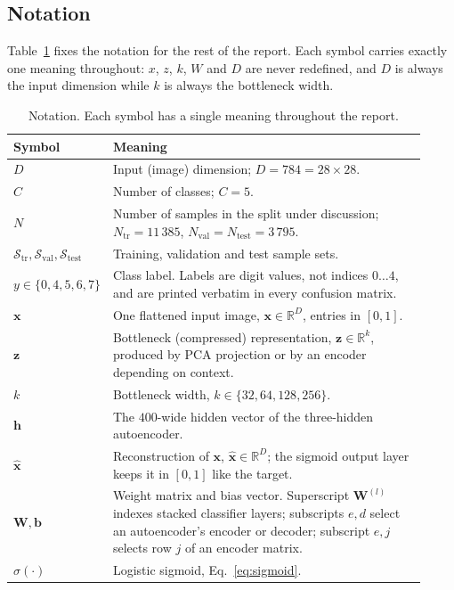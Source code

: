 \documentclass[11pt,a4paper]{article}
\newcommand{\R}{\mathbb{R}}\newcommand{\given}{\mid}\newcommand{\Acc}{\mathrm{Acc}}
\begin{document}
\subsection{Notation}\label{sec:dataset:notation}
Table~\ref{tab:notation} fixes the notation for the rest of the report.  Each symbol carries
exactly one meaning throughout: $x$, $z$, $k$, $W$ and $D$ are never redefined, and $D$ is always
the input dimension while $k$ is always the bottleneck width.

\begin{table}[htbp]\centering\small
\caption{Notation.  Each symbol has a single meaning throughout the report.}\label{tab:notation}
\begin{tabular}{@{}p{0.10\linewidth}p{0.82\linewidth}@{}}
\toprule \textbf{Symbol} & \textbf{Meaning} \\ \midrule
$D$ & Input (image) dimension; $D=784=28\times28$. \\
$C$ & Number of classes; $C=5$. \\
$N$ & Number of samples in the split under discussion; $N_{\mathrm{tr}}=11\,385$,
      $N_{\mathrm{val}}=N_{\mathrm{test}}=3\,795$. \\
$\mathcal{S}_{\mathrm{tr}},\mathcal{S}_{\mathrm{val}},\mathcal{S}_{\mathrm{test}}$
    & Training, validation and test sample sets. \\
$y\in\{0,4,5,6,7\}$ & Class label.  Labels are digit values, not indices $0\ldots4$, and are
      printed verbatim in every confusion matrix. \\
$\mathbf{x}$ & One flattened input image, $\mathbf{x}\in\R^{D}$, entries in $[0,1]$. \\
$\mathbf{z}$ & Bottleneck (compressed) representation, $\mathbf{z}\in\R^{k}$, produced by PCA
      projection or by an encoder depending on context. \\
$k$ & Bottleneck width, $k\in\{32,64,128,256\}$. \\
$\mathbf{h}$ & The $400$-wide hidden vector of the three-hidden autoencoder. \\
$\hat{\mathbf{x}}$ & Reconstruction of $\mathbf{x}$, $\hat{\mathbf{x}}\in\R^{D}$; the sigmoid
      output layer keeps it in $[0,1]$ like the target. \\
$\mathbf{W},\mathbf{b}$ & Weight matrix and bias vector.  Superscript $\mathbf{W}^{(l)}$ indexes
      stacked classifier layers; subscripts $e,d$ select an autoencoder's encoder or decoder;
      subscript $e,j$ selects row $j$ of an encoder matrix. \\
$\sigma(\cdot)$ & Logistic sigmoid, Eq.~\eqref{eq:sigmoid}. \\

\end{tabular}
\end{table}
\end{document}
